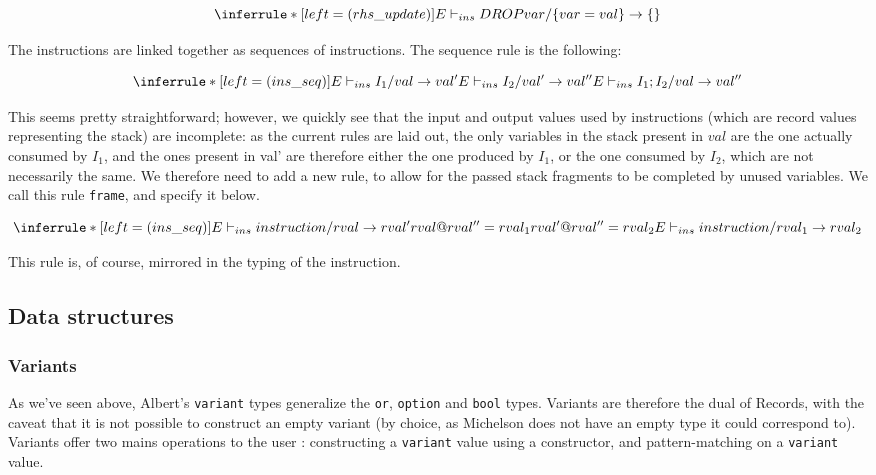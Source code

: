 \documentclass{report}
\begin{document}
$$
\inferrule* [left=(rhs\_update)]
    { }
    { E \vdash_{ins} DROP var / \{ var = val \} \rightarrow \{ \} }
$$

The instructions are linked together as sequences of instructions. The sequence rule is the following:

$$
\inferrule* [left=(ins\_seq)]
    { E \vdash_{ins} I_1 / val \rightarrow val' \\
      E \vdash_{ins} I_2 / val' \rightarrow val'' }
    { E \vdash_{ins} I_1 ; I_2 / val \rightarrow val'' }
$$

This seems pretty straightforward; however, we quickly see that the input and output values used by instructions (which are record values representing the stack) are incomplete: as the current rules are laid out, the only variables in the stack present in $val$ are the one actually consumed by $I_1$, and the ones present in val' are therefore either the one produced by $I_1$, or the one consumed by $I_2$, which are not necessarily the same. We therefore need to add a new rule, to allow for the passed stack fragments to be completed by unused variables. We call this rule \texttt{frame}, and specify it below.

$$
\inferrule* [left=(ins\_seq)]
    { E \vdash_{ins} instruction / rval \rightarrow rval' \\
      rval @ rval'' = rval_1 \\
      rval' @ rval'' = rval_2 }
    { E \vdash_{ins} instruction / rval_1 \rightarrow rval_2 }
$$

This rule is, of course, mirrored in the typing of the instruction.

\subsection{Data structures}

\subsubsection{Variants}

As we've seen above, Albert's \texttt{variant} types generalize the \texttt{or}, \texttt{option} and \texttt{bool} types. Variants are therefore the dual of Records, with the caveat that it is not possible to construct an empty variant (by choice, as Michelson does not have an empty type it could correspond to). Variants offer two mains operations to the user : constructing a \texttt{variant} value using a constructor, and pattern-matching on a \texttt{variant} value.
\end{document}
